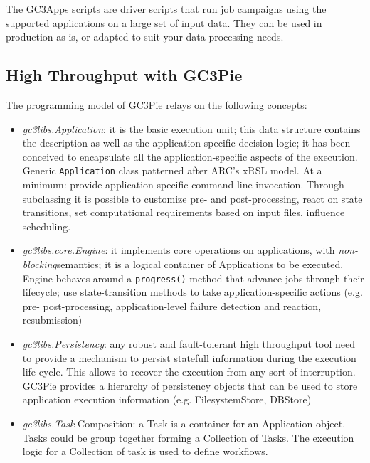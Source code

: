 \documentclass{PoS}
\begin{document}
The GC3Apps scripts are driver scripts that run job campaigns using
the supported applications on a large set of input data. They can be
used in production as-is, or adapted to suit your data processing
needs. 

\subsection{High Throughput with GC3Pie}
The programming model of GC3Pie relays on the following concepts:
\begin{itemize}
\item \emph{gc3libs.Application}: it is the basic execution unit; this data
  structure contains the description as well as the
  application-specific decision logic; it has been conceived to
  encapsulate all the application-specific aspects of the
  execution. Generic \texttt{Application} class
  patterned after
  ARC's xRSL \cite{arc:xrsl}
  model. At a minimum: provide application-specific command-line
  invocation. Through subclassing it is possible to customize pre- and
  post-processing, react on state transitions, set computational
  requirements based on input files, influence scheduling.
\item \emph{gc3libs.core.Engine}: it implements core operations on
  applications, with \emph{non-blocking}semantics; it is a logical
  container of Applications to be executed.
  Engine behaves around a \texttt{progress()} method that advance jobs
  through their lifecycle; use state-transition methods to take
  application-specific actions (e.g. pre- post-processing,
  application-level failure detection and reaction, resubmission)
\item \emph{gc3libs.Persistency}: any robust and fault-tolerant high
  throughput tool need to provide a mechanism to persist statefull
  information during the execution life-cycle. This allows to recover
  the execution from any sort of interruption. GC3Pie provides a
  hierarchy of persistency objects that can be used to store
  application execution information (e.g. FilesystemStore, DBStore)
\item \emph{gc3libs.Task} Composition: a Task is a container for an
  Application object. Tasks could be group together forming a
  Collection of Tasks. The execution logic for a Collection of task is
  used to define workflows.
\end{itemize}
\end{document}
